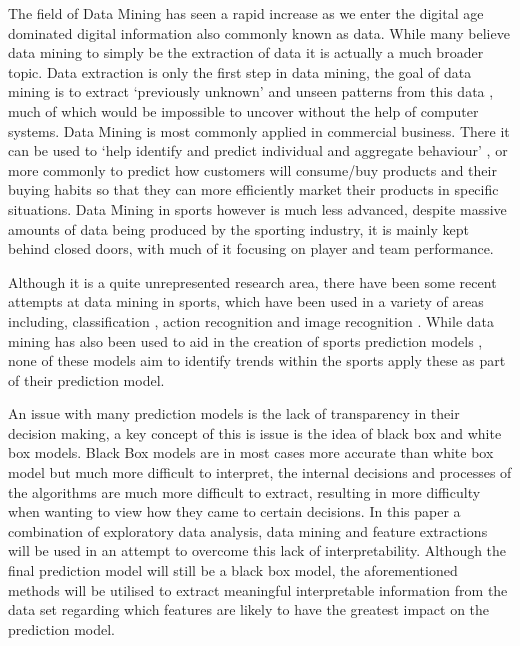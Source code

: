\documentclass{imc-inf}
\begin{document}
	The field of Data Mining has seen a rapid increase as we enter the digital age dominated digital information also commonly known as data. While many believe data mining to simply be the extraction of data it is actually a much broader topic. Data extraction is only the first step in data mining, the goal of data mining is to extract ‘previously unknown’ and unseen patterns from this data \cite{website:TechGuy}, much of which would be impossible to uncover without the help of computer systems. Data Mining is most commonly applied in commercial business. There it can be used to ‘help identify and predict individual and aggregate behaviour’ \cite{ACM}, or more commonly to predict how customers will consume/buy products and their buying habits so that they can more efficiently market their products in specific situations. Data Mining in sports however is much less advanced, despite massive amounts of data being produced by the sporting industry, it is mainly kept behind closed doors, with much of it focusing on player and team performance.
	\newline
		
	Although it is a quite unrepresented research area, there have been some recent attempts at data mining in sports, which have been used in a variety of areas including, classification \cite{Displays}, action recognition \cite{AEJ} and image recognition \cite{Heliyon}. While data mining has also been used to aid in the creation of sports prediction models \cite{CollegeFootball}\cite{Basketball}\cite{LSTMPrediction}, none of these models aim to identify trends within the sports apply these as part of their prediction model. 
	
	An issue with many prediction models is the lack of transparency in their decision making, a key concept of this is issue is the idea of black box and white box models. Black Box models are in most cases more accurate than white box model but much more difficult to interpret, the internal decisions and processes of the algorithms are much more difficult to extract, resulting in more difficulty when wanting to view how they came to certain decisions. In this paper a combination of exploratory data analysis, data mining and feature extractions will be used in an attempt to overcome this lack of interpretability. Although the final prediction model will still be a black box model, the aforementioned methods will be utilised to extract meaningful interpretable information from the data set regarding which features are likely to have the greatest impact on the prediction model.
	\newline
	
\end{document}
